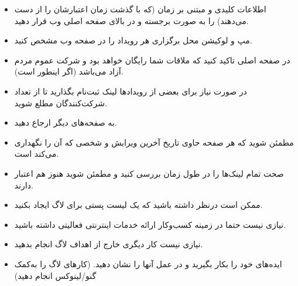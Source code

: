 \begin{itemize}
\item
اطلاعات کلیدی و مبتنی بر زمان (که با گذشت زمان اعتبارشان را از دست می‌دهند)
را به صورت برجسته و در بالای صفحه اصلی وب قرار دهید.
\item
مپ و لوکیشن محل برگزاری هر رویداد را در صفحه وب مشخص کنید.
\item
در صفحه اصلی تاکید کنید که ملاقات شما رایگان خواهد بود و شرکت عموم مردم آزاد می‌باشد
(اگر اینطور است).
\item
در صورت نیاز برای بعضی از رویدادها لینک ثبت‌نام بگذارید تا از تعداد شرکت‌کنندگان مطلع شوید.
\item
به صفحه‌های دیگر ارجاع دهید.
\item
مطمئن شوید که هر صفحه حاوی تاریخ آخرین ویرایش و شخصی که آن را نگهداری می‌کند است.
\item
صحت تمام لینک‌ها را در طول زمان بررسی کنید و مطمئن شوید هنوز هم اعتبار دارند.
\item
ممکن است درنظر داشته باشید که یک لیست پستی برای لاگ ایجاد بکنید.
\item
نیازی نیست حتما در زمینه کسب‌وکار ارائه خدمات اینترنتی فعالیتی داشته باشید.
\item
نیازی نیست کار دیگری خارج از اهداف لاگ انجام بدهید.
\item
ایده‌های خود را بکار بگیرید و در عمل آنها را نشان دهید.
(کارهای لاگ را به‌کمک گنو/لینوکس انجام دهید)
\end{itemize}

